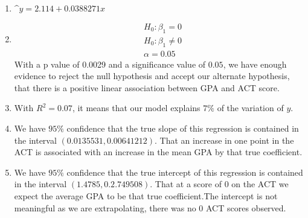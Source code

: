 \documentclass[10pt]{article}
\newenvironment{answer}[2][Answer]{\begin{trivlist}
\item[\hskip \labelsep {\bfseries #1}\hskip \labelsep {\bfseries #2.}]}{\end{trivlist}}
\begin{document}
\begin{answer}{7}
$ $\newline
\begin{enumerate}
    \item $\^y=2.114+0.0388271x$
    \item 
    \begin{equation}
    \begin{split}
    & H_{0} : \beta_{1} = 0 \\
    & H_{0} : \beta_{1} \neq 0 \\
    & \alpha = 0.05
    \end{split}
    \end{equation}
    With a p value of 0.0029 and a significance value of $0.05$, we have enough evidence to reject the null hypothesis and accept our alternate hypothesis, that there is a positive linear association between GPA and ACT score.
    \item With $R^{2} = 0.07$, it means that our model explains $7\%$ of the variation of $y$.
    \item We have $95\%$ confidence that the true slope of this regression is contained in the interval $(0.0135531,0.00641212)$. That an increase in one point in the ACT is associated with an increase in the mean GPA by that true coefficient.
    \item We have $95\%$ confidence that the true intercept of this regression is contained in the interval $(1.4785,0.2.749508)$. That at a score of 0 on the ACT we expect the average GPA to be that true coefficient.The intercept is not meaningful as we are extrapolating, there was no 0 ACT scores observed.
\end{enumerate}
\end{answer}
\end{document}
